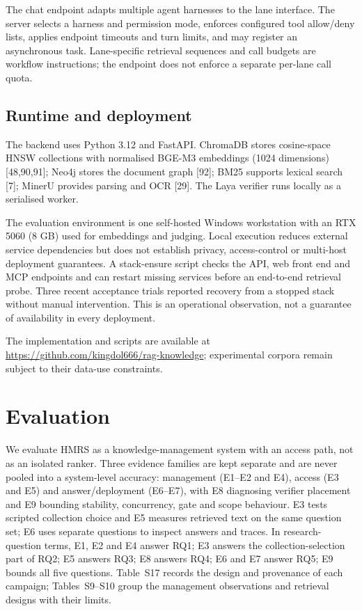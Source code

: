 \documentclass[11pt]{article}
\begin{document}
The chat endpoint adapts multiple agent harnesses to the lane interface. The
server selects a harness and permission mode, enforces configured tool
allow/deny lists, applies endpoint timeouts and turn limits, and may register an
asynchronous task. Lane-specific retrieval sequences and call budgets are
workflow instructions; the endpoint does not enforce a separate per-lane call
quota.

\subsection{Runtime and deployment}


The backend uses Python 3.12 and FastAPI. ChromaDB stores cosine-space HNSW
collections with normalised BGE-M3 embeddings (1024 dimensions)
[48,90,91]; Neo4j stores the document graph [92];
BM25 supports lexical search [7]; MinerU provides parsing and OCR
[29]. The Laya verifier runs locally as a serialised worker.

The evaluation environment is one self-hosted Windows workstation with an
RTX 5060 (8 GB) used for embeddings and judging. Local execution reduces
external service dependencies but does not establish privacy, access-control or
multi-host deployment guarantees. A stack-ensure script checks the API, web
front end and MCP endpoints and can restart missing services before an
end-to-end retrieval probe. Three recent acceptance trials reported recovery
from a stopped stack without manual intervention. This is an operational
observation, not a guarantee of availability in every deployment.

The implementation and scripts are available
at \url{https://github.com/kingdol666/rag-knowledge}; experimental corpora
remain subject to their data-use constraints.


\section{Evaluation}

We evaluate HMRS as a knowledge-management system with an access path, not as
an isolated ranker. Three evidence families are kept separate and are never
pooled into a system-level accuracy: management (E1--E2 and E4), access (E3
and E5) and answer/deployment (E6--E7), with E8 diagnosing verifier
placement and E9 bounding stability, concurrency, gate and scope behaviour.
E3 tests scripted collection choice and E5 measures retrieved text on the
same question set; E6 uses separate questions to inspect answers and traces.
In research-question terms, E1, E2 and E4 answer RQ1; E3 answers the
collection-selection part of RQ2; E5 answers RQ3; E8 answers RQ4; E6 and E7
answer RQ5; E9 bounds all five questions. Table~S17 records the design and
provenance of each campaign; Tables~S9--S10 group the management
observations and retrieval designs with their limits.
\end{document}
